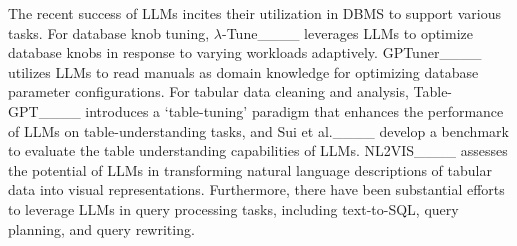  The recent success of LLMs incites their utilization in DBMS to support various tasks.  
For database knob tuning, $\lambda$-Tune____ leverages LLMs to optimize database knobs in response to varying workloads  adaptively. GPTuner____ utilizes LLMs to read manuals as domain knowledge for optimizing database parameter configurations.
For tabular data cleaning and analysis, Table-GPT____ 
introduces a `table-tuning' paradigm that enhances the performance of LLMs on table-understanding tasks, and Sui et al.____ develop a benchmark to evaluate the table understanding capabilities of LLMs. 
NL2VIS____ assesses the potential of LLMs in transforming natural language descriptions of tabular data into visual representations.  
Furthermore, there have been substantial efforts to leverage LLMs in query processing tasks, including text-to-SQL, query planning, and query rewriting.  

